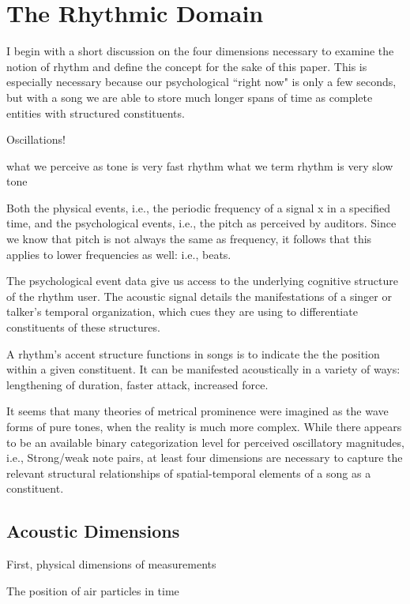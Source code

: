 \chapter{The Rhythmic Domain}
I begin with a short discussion on the four dimensions necessary to examine the notion of rhythm and define the concept for the sake of this paper. This is especially necessary because our psychological ``right now" is only a few seconds, but with a song we are able to store much longer spans of time as complete entities with structured constituents. 

Oscillations!

what we perceive as tone is very fast rhythm
what we term rhythm is very slow tone

Both the physical events, i.e., the periodic frequency of a signal x in a specified time, and the psychological events, i.e., the pitch as perceived by auditors. Since we know that pitch is not always the same as frequency, it follows that this applies to lower frequencies as well: i.e., beats. 

The psychological event data give us access to the underlying cognitive structure of the rhythm user. The acoustic signal details the manifestations of a singer or talker's temporal organization, which cues they are using to differentiate constituents of these structures. 

A rhythm's accent structure functions in songs is to indicate the the position within a given constituent. It can be manifested acoustically in a variety of ways: lengthening of duration, faster attack, increased force. 


It seems that many theories of metrical prominence were imagined as the wave forms of pure tones, when the reality is much more complex. While there appears to be an available binary categorization level for perceived oscillatory magnitudes, i.e., Strong/weak note pairs, at least four dimensions are necessary to capture the relevant structural relationships of spatial-temporal elements of a song as a constituent. 

\section{Acoustic Dimensions}



First, physical dimensions of measurements


The position of air particles in time

